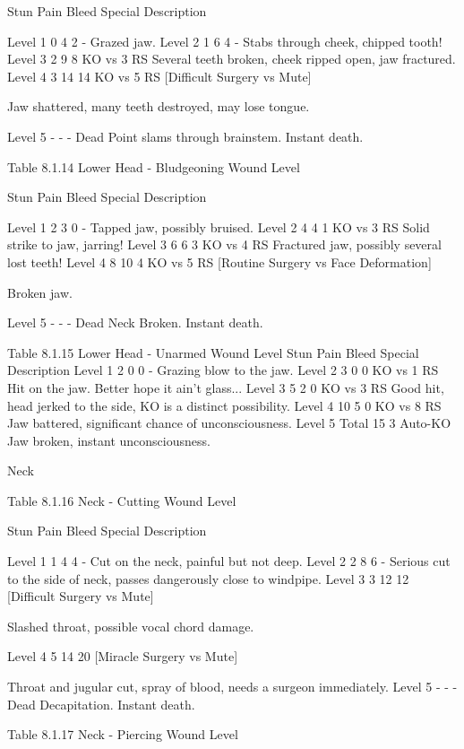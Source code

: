 \documentclass[oneside,11pt,english]{book}
\begin{document}
Stun Pain Bleed Special Description 

Level 1 0 4 2 - Grazed jaw. 
Level 2 1 6 4 - Stabs through cheek, chipped tooth! 
Level 3 2 9 8 KO vs 3 RS Several teeth broken, cheek ripped open, jaw 
fractured. 
Level 4 3 14 14 KO vs 5 RS 
[Difficult Surgery vs 
Mute] 

Jaw shattered, many teeth destroyed, may lose 
tongue. 

Level 5 - - - Dead Point slams through brainstem. Instant death. 

 
Table 8.1.14 Lower Head - Bludgeoning 
Wound 
Level 

Stun Pain Bleed Special Description 

Level 1 2 3 0 - Tapped jaw, possibly bruised. 
Level 2 4 4 1 KO vs 3 RS Solid strike to jaw, jarring! 
Level 3 6 6 3 KO vs 4 RS Fractured jaw, possibly several lost 
teeth! 
Level 4 8 10 4 KO vs 5 RS 
[Routine Surgery vs Face 
Deformation] 

Broken jaw. 

Level 5 - - - Dead Neck Broken. Instant death. 

 
Table 8.1.15 Lower Head - Unarmed 
Wound Level Stun Pain Bleed Special Description 
Level 1 2 0 0 - Grazing blow to the jaw. 
Level 2 3 0 0 KO vs 1 RS Hit on the jaw. Better hope it ain’t glass... 
Level 3 5 2 0 KO vs 3 RS Good hit, head jerked to the side, KO is a distinct possibility. 
Level 4 10 5 0 KO vs 8 RS Jaw battered, significant chance of unconsciousness. 
Level 5 Total 15 3 Auto-KO Jaw broken, instant unconsciousness. 

 

 

Neck 

 


Table 8.1.16 Neck - Cutting 
Wound 
Level 

Stun Pain Bleed Special Description 

Level 1 1 4 4 - Cut on the neck, painful but not deep. 
Level 2 2 8 6 - Serious cut to the side of neck, passes dangerously 
close to windpipe. 
Level 3 3 12 12 [Difficult Surgery vs 
Mute] 

Slashed throat, possible vocal chord damage. 

Level 4 5 14 20 [Miracle Surgery vs 
Mute] 

Throat and jugular cut, spray of blood, needs a 
surgeon immediately. 
Level 5 - - - Dead Decapitation. Instant death. 

 
Table 8.1.17 Neck - Piercing 
Wound 
Level 
\end{document}
